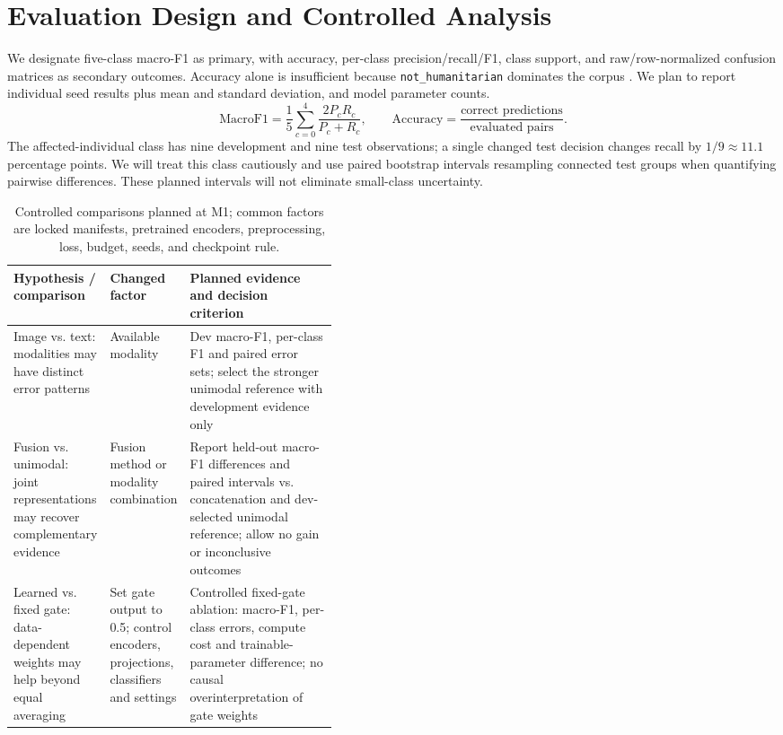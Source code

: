 \documentclass[11pt,a4paper]{article}
\begin{document}
\section{Evaluation Design and Controlled Analysis}
We designate five-class macro-F1 as primary, with accuracy, per-class precision/recall/F1, class support, and raw/row-normalized confusion matrices as secondary outcomes. Accuracy alone is insufficient because \texttt{not\_humanitarian} dominates the corpus \cite{handbook2026}. We plan to report individual seed results plus mean and standard deviation, and model parameter counts.
\begin{equation}
\mathrm{MacroF1}=\frac{1}{5}\sum_{c=0}^{4}\frac{2P_cR_c}{P_c+R_c},\qquad
\mathrm{Accuracy}=\frac{\text{correct predictions}}{\text{evaluated pairs}}.
\label{eq:metrics}
\end{equation}
The affected-individual class has nine development and nine test observations; a single changed test decision changes recall by $1/9\approx11.1$ percentage points. We will treat this class cautiously and use paired bootstrap intervals resampling connected test groups when quantifying pairwise differences. These planned intervals will not eliminate small-class uncertainty.

\begin{table}[htbp]
\centering\footnotesize
\caption{Controlled comparisons planned at M1; common factors are locked manifests, pretrained encoders, preprocessing, loss, budget, seeds, and checkpoint rule.}
\label{tab:comparisons}
\begin{tabularx}{\linewidth}{@{}>{\raggedright\arraybackslash}p{0.22\linewidth}>{\raggedright\arraybackslash}p{0.20\linewidth}>{\raggedright\arraybackslash}X@{}}
\toprule
Hypothesis / comparison & Changed factor & Planned evidence and decision criterion \\
\midrule
Image vs. text: modalities may have distinct error patterns & Available modality & Dev macro-F1, per-class F1 and paired error sets; select the stronger unimodal reference with development evidence only \\
Fusion vs. unimodal: joint representations may recover complementary evidence & Fusion method or modality combination & Report held-out macro-F1 differences and paired intervals vs. concatenation and dev-selected unimodal reference; allow no gain or inconclusive outcomes \\
Learned vs. fixed gate: data-dependent weights may help beyond equal averaging & Set gate output to 0.5; control encoders, projections, classifiers and settings & Controlled fixed-gate ablation: macro-F1, per-class errors, compute cost and trainable-parameter difference; no causal overinterpretation of gate weights \\
\bottomrule
\end{tabularx}
\end{table}
\end{document}
